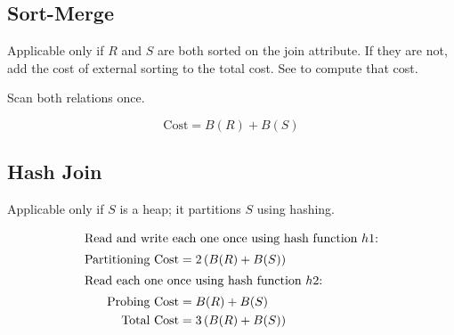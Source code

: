 \documentclass{article}
\newcommand{\paren}[1]{\left(#1\right)}
\begin{document}
\subsection{Sort-Merge}

Applicable only if \(R\) and \(S\) are both sorted on the join
attribute. If they are not, add the cost of external sorting to the
total cost. See  to compute that cost.

Scan both relations once.

\begin{equation}
  \text{Cost} = B(R) + B(S)
\end{equation}

\subsection{Hash Join}

Applicable only if \(S\) is a heap; it partitions \(S\) using hashing.

\begin{align}
  \intertext{Read and write each one once using hash function \(h1\):}
  \text{Partitioning Cost} &= 2\paren{B(R) + B(S)} \\
  \intertext{Read each one once using hash function \(h2\):}
  \text{Probing Cost} &= B(R) + B(S) \\
  \text{Total Cost} &= 3\paren{B(R) + B(S)}
\end{align}
\end{document}
